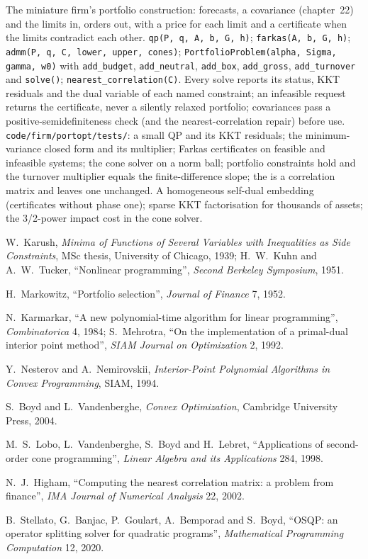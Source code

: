 \begin{build}
 The miniature firm's portfolio construction: forecasts, a covariance (chapter~22) and the limits in, orders out, with a price for each limit and a certificate when the limits
contradict each other.
 \texttt{qp(P, q, A, b, G, h)}; \texttt{farkas(A, b, G, h)}; \texttt{admm(P, q, C, lower, upper, cones)}; \texttt{PortfolioProblem(alpha, Sigma, gamma, w0)} with
\texttt{add\_budget}, \texttt{add\_neutral}, \texttt{add\_box}, \texttt{add\_gross}, \texttt{add\_turnover} and \texttt{solve()}; \texttt{nearest\_correlation(C)}.
 Every solve reports its status, KKT residuals and the dual variable of each named constraint; an infeasible request returns the certificate, never a silently relaxed portfolio;
covariances pass a positive-semidefiniteness check (and the nearest-correlation repair) before use.
 \texttt{code/firm/portopt/tests/}: a small QP and its KKT residuals; the minimum-variance closed form and its multiplier; Farkas certificates on feasible and infeasible
systems; the cone solver on a norm ball; portfolio constraints hold and the turnover multiplier equals the finite-difference slope; the  is a correlation matrix and
leaves one unchanged.
 A homogeneous self-dual embedding (certificates without phase one); sparse KKT factorisation for thousands of assets; the 3/2-power impact cost in the cone solver.
\end{build}

\begin{omsources}
\item W.~Karush, \emph{Minima of Functions of Several Variables with Inequalities as Side Constraints}, MSc thesis, University of Chicago, 1939; H.~W.~Kuhn and A.~W.~Tucker, ``Nonlinear
programming'', \emph{Second Berkeley Symposium}, 1951.
\item H.~Markowitz, ``Portfolio selection'', \emph{Journal of Finance} 7, 1952.
\item N.~Karmarkar, ``A new polynomial-time algorithm for linear programming'', \emph{Combinatorica} 4, 1984; S.~Mehrotra, ``On the implementation of a primal-dual interior point method'',
\emph{SIAM Journal on Optimization} 2, 1992.
\item Y.~Nesterov and A.~Nemirovskii, \emph{Interior-Point Polynomial Algorithms in Convex Programming}, SIAM, 1994.
\item S.~Boyd and L.~Vandenberghe, \emph{Convex Optimization}, Cambridge University Press, 2004.
\item M.~S.~Lobo, L.~Vandenberghe, S.~Boyd and H.~Lebret, ``Applications of second-order cone programming'', \emph{Linear Algebra and its Applications} 284, 1998.
\item N.~J.~Higham, ``Computing the nearest correlation matrix: a problem from finance'', \emph{IMA Journal of Numerical Analysis} 22, 2002.
\item B.~Stellato, G.~Banjac, P.~Goulart, A.~Bemporad and S.~Boyd, ``OSQP: an operator splitting solver for quadratic programs'', \emph{Mathematical Programming Computation} 12, 2020.
\end{omsources}

